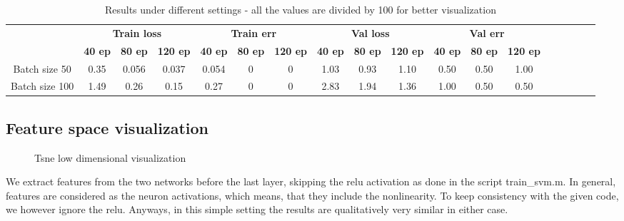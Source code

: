 \documentclass{article}
\begin{document}
\begin{table}
	\centering
	\captionsetup{justification=centering}
	\renewcommand{\arraystretch}{1.5}
	\setlength{\abovecaptionskip}{15pt plus 3pt minus 2pt} %
	\begin{tabular}{|c|c|c|c|c|c|c|c|c|c|c|c|c|c|c|c|c|c|}
		\hline
		& \multicolumn{3}{c|}{\textbf{Train loss}} & \multicolumn{3}{c|}{\textbf{Train err}} & \multicolumn{3}{c|}{\textbf{Val loss}} & \multicolumn{3}{c|}{\textbf{Val err}} \\
		\cline{2-13}
		& \textbf{40 ep} & \textbf{80 ep} & \textbf{120 ep} & \textbf{40 ep} & \textbf{80 ep} & \textbf{120 ep} & \textbf{40 ep} & \textbf{80 ep} & \textbf{120 ep} & \textbf{40 ep} & \textbf{80 ep} & \textbf{120 ep}  \\
		\hline
	Batch size 50          & 0.35 & 0.056 & 0.037 & 0.054 & 0 & 0 & 1.03 & 0.93 & 1.10 & 0.50 & 0.50 & 1.00 \\ \hline
	Batch size 100          & 1.49 & 0.26 & 0.15 & 0.27 & 0 & 0 & 2.83 & 1.94 & 1.36 & 1.00 & 0.50 & 0.50 \\ \hline
	
	\end{tabular}
    \caption{Results under different settings - all the values are divided by 100 for better visualization}
	\label{tab:restab}
\end{table}

\subsection{Feature space visualization}

\begin{figure}[h]
    \centering
    \caption{Tsne low dimensional visualization}
\label{fig:tsne}
\end{figure}

We extract features from the two networks before the last layer, skipping the relu activation as done in the script train\_svm.m. In general, features are considered as the neuron activations, which means, that they include the nonlinearity. To keep consistency with the given code, we however ignore the relu. Anyways, in this simple setting the results are qualitatively very similar in either case.
\end{document}
